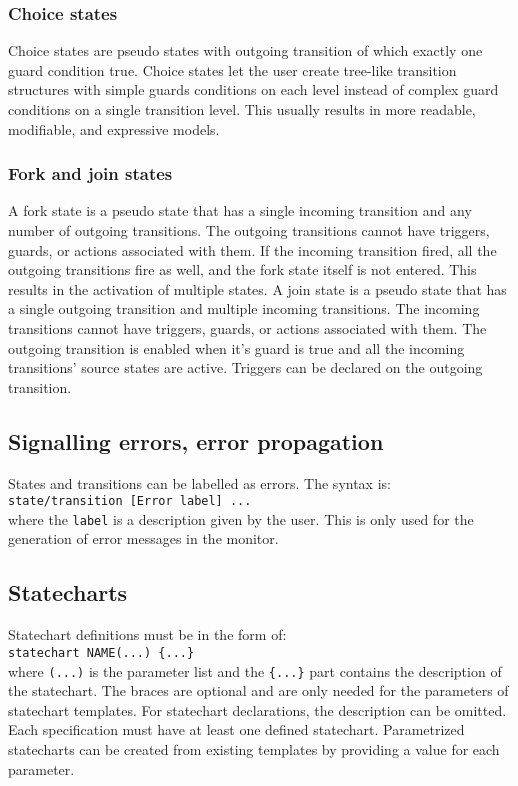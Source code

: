 {    \subsubsection{Choice states}
Choice states are pseudo states with outgoing transition of which exactly one guard condition true. Choice states let the user create tree-like transition structures with simple guards conditions on each level instead of complex guard conditions on a single transition level. This usually results in more readable, modifiable, and expressive models.
    \subsubsection{Fork and join states}
A fork state is a pseudo state that has a single incoming transition and any number of outgoing transitions. The outgoing transitions cannot have triggers, guards, or actions associated with them. If the incoming transition fired, all the outgoing transitions fire as well, and the fork state itself is not entered. This results in the activation of multiple states.
A join state is a pseudo state that has a single outgoing transition and multiple incoming transitions. The incoming transitions cannot have triggers, guards, or actions associated with them. The outgoing transition is enabled when it's guard is true and all the incoming transitions' source states are active. Triggers can be declared on the outgoing transition.
  \subsection{Signalling errors, error propagation}
States and transitions can be labelled as errors. The syntax is: \\\verb!state/transition [Error label] ...!\\ where the \verb!label! is a description given by the user. This is only used for the generation of error messages in the monitor.
  \subsection{Statecharts}
Statechart definitions must be in the form of: \\\verb!statechart NAME(...) {...}!\\ where \verb!(...)! is the parameter list and the \verb!{...}! part contains the description of the statechart. The braces are optional and are only needed for the parameters of statechart templates. For statechart declarations, the description can be omitted. Each specification must have at least one defined statechart. Parametrized statecharts can be created from existing templates by providing a value for each parameter.
}
